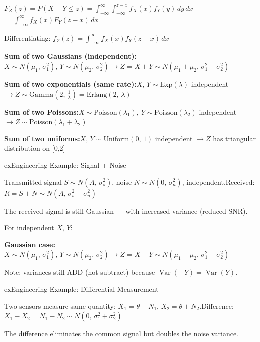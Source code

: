 
$F_{Z}(z) = P(X + Y \le z) = \int_{-\infty}^{\infty} \int_{-\infty}^{z-x} f_{X}(x)f_{Y}(y)\,dy\,dx$\PSbr{}$= \int_{-\infty}^{\infty} f_{X}(x) F_{Y}(z-x)\,dx$

Differentiating: $f_{Z}(z) = \int_{-\infty}^{\infty} f_{X}(x) f_{Y}(z-x)\,dx$ \PSyes{}


\textbf{Sum of two Gaussians (independent):}\PSbr{}$X \sim N(\mu_{1},\, \sigma_{1}^{2}),\, Y \sim N(\mu_{2},\, \sigma_{2}^{2}) \to Z = X+Y \sim N(\mu_{1}+\mu_{2},\, \sigma_{1}^{2}+\sigma_{2}^{2})$

\textbf{Sum of two exponentials (same rate):}\PSbr{}$X,\, Y \sim \mathrm{Exp}(\lambda)$ independent $\to Z \sim \mathrm{Gamma}\left(2,\, \frac{1}{\lambda}\right) = \mathrm{Erlang}(2,\, \lambda)$

\textbf{Sum of two Poissons:}\PSbr{}$X \sim \mathrm{Poisson}(\lambda_{1}),\, Y \sim \mathrm{Poisson}(\lambda_{2})$ independent $\to Z \sim \mathrm{Poisson}(\lambda_{1}+\lambda_{2})$

\textbf{Sum of two uniforms:}\PSbr{}$X,\, Y \sim \mathrm{Uniform}(0,\,1)$ independent $\to Z$ has triangular distribution on [0,2]

\begin{PSbox}[unbreakable]{ex}{Engineering Example: Signal + Noise}

Transmitted signal $S \sim N(A,\, \sigma_{s}^{2})$, noise $N \sim N(0,\, \sigma_{n}^{2})$, independent.\PSbr{}Received: $R = S + N \sim N(A,\, \sigma_{s}^{2} + \sigma_{n}^{2})$

The received signal is still Gaussian — with increased variance (reduced SNR).

\end{PSbox}


For independent $X,\, Y$:

\textbf{Gaussian case:} $X \sim N(\mu_{1},\, \sigma_{1}^{2}),\, Y \sim N(\mu_{2},\, \sigma_{2}^{2}) \to Z = X-Y \sim N(\mu_{1}-\mu_{2},\, \sigma_{1}^{2}+\sigma_{2}^{2})$

Note: variances still ADD (not subtract) because $\operatorname{Var}(-Y) = \operatorname{Var}(Y)$.

\begin{PSbox}[unbreakable]{ex}{Engineering Example: Differential Measurement}

Two sensors measure same quantity: $X_{1} = \theta + N_{1},\, X_{2} = \theta + N_{2}$.\PSbr{}Difference: $X_{1} - X_{2} = N_{1} - N_{2} \sim N(0,\, \sigma_{1}^{2} + \sigma_{2}^{2})$

The difference eliminates the common signal but doubles the noise variance.

\end{PSbox}

